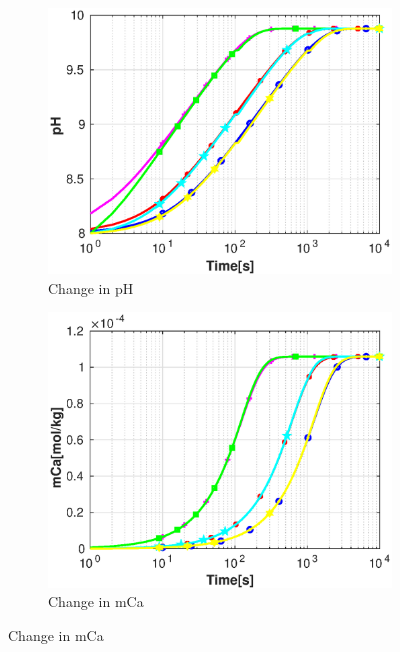 \begin{figure}
   \centering
   \begin{subfigure}{.5\linewidth}
            \centering
        \includegraphics[width=\textwidth]{PICTURES/dvm_pH8_pH.eps}
        \caption{Change in pH}
        \label{fig:dvmpH8pH}
    \end{subfigure}%
        \hfill
    \begin{subfigure}{.5\linewidth}
            \centering
        \includegraphics[width=\textwidth]{PICTURES/dvm_pH8_mCa.eps}
        \caption{Change in mCa}
        \label{fig:dvmpH8mCa}
    \end{subfigure}%

\end{figure}

